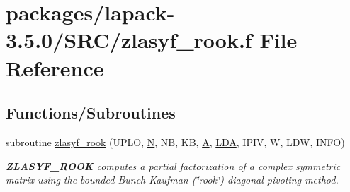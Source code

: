 \hypertarget{zlasyf__rook_8f}{}\section{packages/lapack-\/3.5.0/\+S\+R\+C/zlasyf\+\_\+rook.f File Reference}
\label{zlasyf__rook_8f}
\subsection*{Functions/\+Subroutines}
\begin{DoxyCompactItemize}
\item 
subroutine \hyperlink{group__complex16SYcomputational_ga46d7573c7b86261c84487dc81eefa77b}{zlasyf\+\_\+rook} (U\+P\+L\+O, \hyperlink{polmisc_8c_a0240ac851181b84ac374872dc5434ee4}{N}, N\+B, K\+B, \hyperlink{classA}{A}, \hyperlink{example__user_8c_ae946da542ce0db94dced19b2ecefd1aa}{L\+D\+A}, I\+P\+I\+V, W, L\+D\+W, I\+N\+F\+O)
\begin{DoxyCompactList}\small\item\em {\bfseries Z\+L\+A\+S\+Y\+F\+\_\+\+R\+O\+O\+K} computes a partial factorization of a complex symmetric matrix using the bounded Bunch-\/\+Kaufman (\char`\"{}rook\char`\"{}) diagonal pivoting method. \end{DoxyCompactList}\end{DoxyCompactItemize}
